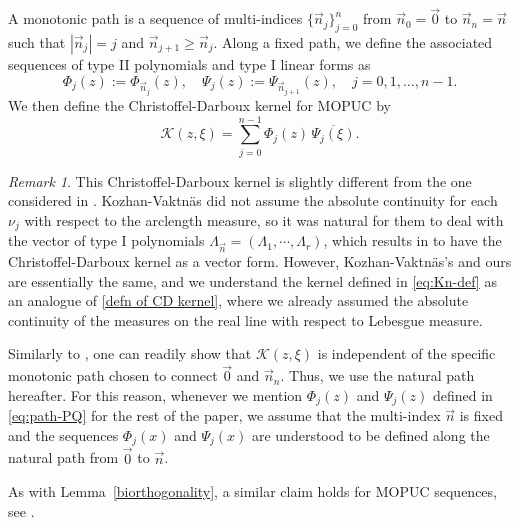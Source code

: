 \documentclass[a4paper,10pt,leqno]{amsart}
\numberwithin{equation}{section}
\theoremstyle{remark}
\newtheorem{remark}{Remark}
\begin{document}
A monotonic path is a sequence of multi-indices $\{\vec{n}_j\}_{j=0}^n$ from $\vec{n}_0=\vec{0}$ to $\vec{n}_n = \vec{n}$ such that $|\vec{n}_j| = j$ and $\vec{n}_{j+1} \geq \vec{n}_j$.
Along a fixed path, we define the associated sequences of type II polynomials and type I linear forms as
\begin{equation}\label{eq:path-PQ}
\Phi_j(z) := \Phi_{\vec{n}_j}(z), \quad \Psi_j(z) := \Psi_{\vec{n}_{j+1}}(z), \quad j=0,1,\dots,n-1.
\end{equation}
We then define the Christoffel-Darboux kernel for MOPUC by
\begin{equation}\label{eq:Kn-def}
\mathcal K(z,\xi)=\sum_{j=0}^{n-1} \Phi_j(z) \, \overline{\Psi_j(\xi)}.
\end{equation}
\begin{remark}
This Christoffel-Darboux kernel is slightly different from the one considered in \cite[Theorem 6.1]{KV24a}. Kozhan-Vaktn\"as did not assume the absolute continuity for each $\nu_j$ with respect to the arclength measure, so it was natural for them to deal with the vector of type I polynomials $\Lambda_{\vec{n}} = (\Lambda_{1}, \cdots, \Lambda_{r})$, which results in to have the Christoffel-Darboux kernel as a vector form. However, Kozhan-Vaktn\"as's and ours are essentially the same, and we understand the kernel defined in \eqref{eq:Kn-def}  as an analogue of \eqref{defn of CD kernel}, where we already assumed the absolute continuity of the measures on the real line with respect to Lebesgue measure.
\end{remark}

Similarly to \cite[Theorem 6.1]{KV24a}, one can readily show that $\mathcal K(z, \xi)$ is independent of the specific monotonic path chosen to connect $\vec{0}$ and $\vec{n}_n$. Thus, we use the natural path hereafter.
For this reason, whenever we mention $\Phi_j(z)$ and $\Psi_j(z)$ defined in \eqref{eq:path-PQ} for the rest of the paper, we assume that the multi-index $\vec{n}$ is fixed and the sequences $\Phi_j(x)$ and $\Psi_j(x)$ are understood to be defined along the natural path from $\vec 0$ to $\vec n$. 

As with Lemma~\ref{biorthogonality}, a similar claim holds for MOPUC sequences, see \cite[Lemma 4.1]{KV24a}.
\end{document}
